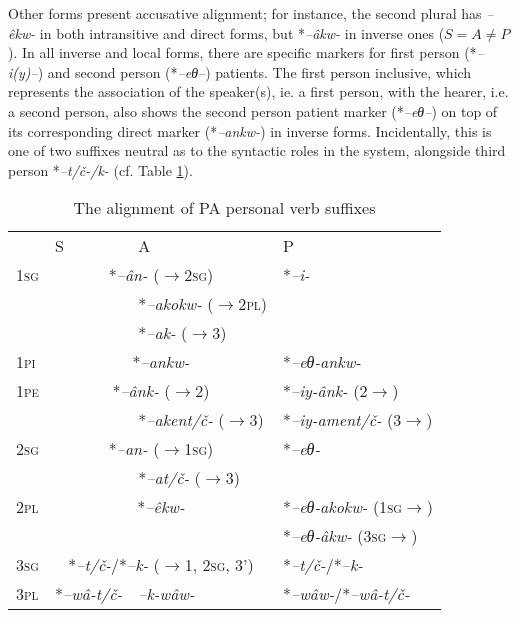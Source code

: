 \documentclass[twoside,a4paper,11pt]{article}
\newcommand{\ipa}[1]{{\phon\textit{#1}}}
\newcommand{\sg}{\textsc{sg}}
\newcommand{\pl}{\textsc{pl}}
\newcommand{\Σ}{\greek{Σ}}
\newcommand{\pli}{\textsc{pi}}
\newcommand{\pe}{\textsc{pe}}
\begin{document}
Other forms present accusative alignment; for instance, the second plural has \ipa{--êkw-} in both intransitive and direct forms, but *\ipa{--âkw-}  in inverse ones ($S = A \ne P$). In all inverse and local forms, there are specific markers for first person (*\ipa{--i(y)--}) and second person (*\ipa{--eθ--}) patients. The first person inclusive, which represents the association of the speaker(s), ie. a first person, with the hearer, i.e. a second person, also shows the second person patient marker (*\ipa{--eθ--}) on top of its corresponding direct marker (*\ipa{--ankw-}) in inverse forms. Incidentally, this is one of two suffixes neutral as to the syntactic roles in the system, alongside third person *\ipa{--t/č-/k-} (cf. Table \ref{tab:protoalg.align}).


\begin{table}[H]
\caption{The alignment of PA personal verb suffixes}
\centering \label{tab:protoalg.align}
\begin{tabular}{llll}
\toprule
& S & A & P\\
1\sg & \multicolumn{2}{c}{*\ipa{--ân-} ($\rightarrow$2\sg)}\hspace{1.5cm} & *\ipa{--i-}\\
 & & *\ipa{--akokw-} ($\rightarrow$2\pl) &\\
& & *\ipa{--ak-} ($\rightarrow$3) &\\
1\pli & \multicolumn{2}{c}{*\ipa{--ankw-}}\hspace{2.2cm} & *\ipa{--eθ-ankw-}\\
1\pe & \multicolumn{2}{c}{*\ipa{--ânk-}  ($\rightarrow$2)} \hspace{1.5cm} & *\ipa{--iy-ânk-} (2$\rightarrow$)\\
& & *\ipa{--akent/č-}  ($\rightarrow$3)& *\ipa{--iy-ament/č-} (3$\rightarrow$) \\
\midrule
2\sg & \multicolumn{2}{c}{*\ipa{--an-} ($\rightarrow$1\sg)}\hspace{1.5cm} & *\ipa{--eθ-}\\
&&*\ipa{--at/č-} ($\rightarrow$3) &\\
2\pl & \multicolumn{2}{c}{*\ipa{--êkw-}}\hspace{2.5cm} & *\ipa{--eθ-akokw-}  (1\sg$\rightarrow$) \\
& & & *\ipa{--eθ-âkw-}  (3\sg$\rightarrow$)\\
\midrule
3\sg & \multicolumn{2}{c}{*\ipa{--t/č-}/*\ipa{--k-} ($\rightarrow$1, 2\sg, 3')}\hspace{0.5cm} & *\ipa{--t/č-}/*\ipa{--k-}\\
3\pl & *\ipa{--wâ-t/č-} & \ipa{--k-wâw-} & *\ipa{--wâw-}/*\ipa{--wâ-t/č-}  \\
\bottomrule
\end{tabular}
\end{table}
\end{document}
